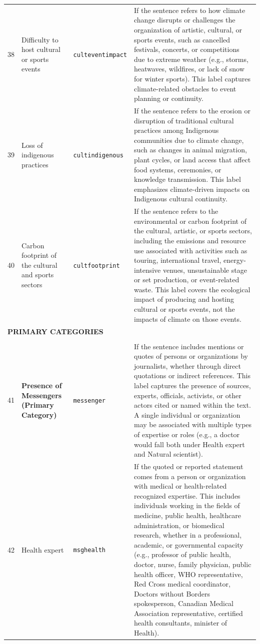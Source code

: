 \documentclass[12pt]{article}
\renewcommand\_{\texttt{\detokenize{_}\allowbreak}}
\begin{document}
{\begin{longtable}{p{0.5cm}p{4.5cm}p{2.8cm}p{13.5cm}}
38 & Difficulty to host cultural or sports events & \texttt{cult\_event\_impact} & If the sentence refers to how climate change disrupts or challenges the organization of artistic, cultural, or sports events, such as cancelled festivals, concerts, or competitions due to extreme weather (e.g., storms, heatwaves, wildfires, or lack of snow for winter sports). This label captures climate-related obstacles to event planning or continuity. \\
39 & Loss of indigenous practices & \texttt{cult\_indigenous} & If the sentence refers to the erosion or disruption of traditional cultural practices among Indigenous communities due to climate change, such as changes in animal migration, plant cycles, or land access that affect food systems, ceremonies, or knowledge transmission. This label emphasizes climate-driven impacts on Indigenous cultural continuity. \\
40 & Carbon footprint of the cultural and sports sectors & \texttt{cult\_footprint} & If the sentence refers to the environmental or carbon footprint of the cultural, artistic, or sports sectors, including the emissions and resource use associated with activities such as touring, international travel, energy-intensive venues, unsustainable stage or set production, or event-related waste. This label covers the ecological impact of producing and hosting cultural or sports events, not the impacts of climate on those events. \\
\midrule
\multicolumn{4}{l}{\cellcolor{gray!10}\textbf{PRIMARY CATEGORIES}} \\
\midrule
\rowcolor{gray!8}
\multicolumn{4}{l}{\textit{Actors/Messengers}} \\
\midrule
41 & \textbf{Presence of Messengers\newline (Primary Category)} & \texttt{messenger} & If the sentence includes mentions or quotes of persons or organizations by journalists, whether through direct quotations or indirect references. This label captures the presence of sources, experts, officials, activists, or other actors cited or named within the text. A single individual or organization may be associated with multiple types of expertise or roles (e.g., a doctor would fall both under Health expert and Natural scientist). \\
\cmidrule(lr){1-4}
42 & Health expert & \texttt{msg\_health} & If the quoted or reported statement comes from a person or organization with medical or health-related recognized expertise. This includes individuals working in the fields of medicine, public health, healthcare administration, or biomedical research, whether in a professional, academic, or governmental capacity (e.g., professor of public health, doctor, nurse, family physician, public health officer, WHO representative, Red Cross medical coordinator, Doctors without Borders spokesperson, Canadian Medical Association representative, certified health consultants, minister of Health). \\

\end{longtable}}
\end{document}
